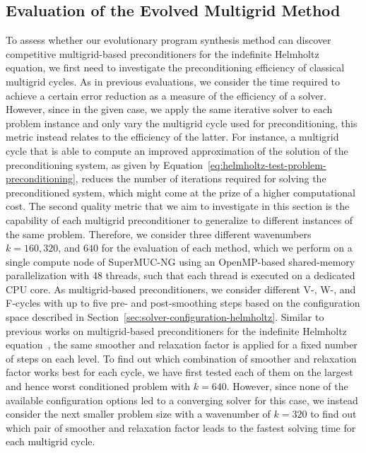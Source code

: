\subsection{Evaluation of the Evolved Multigrid Method}
To assess whether our evolutionary program synthesis method can discover competitive multigrid-based preconditioners for the indefinite Helmholtz equation, we first need to investigate the preconditioning efficiency of classical multigrid cycles.
As in previous evaluations, we consider the time required to achieve a certain error reduction as a measure of the efficiency of a solver.
However, since in the given case, we apply the same iterative solver to each problem instance and only vary the multigrid cycle used for preconditioning, this metric instead relates to the efficiency of the latter.
For instance, a multigrid cycle that is able to compute an improved approximation of the solution of the preconditioning system, as given by Equation~\eqref{eq:helmholtz-test-problem-preconditioning}, reduces the number of iterations required for solving the preconditioned system, which might come at the prize of a higher computational cost.
The second quality metric that we aim to investigate in this section is the capability of each multigrid preconditioner to generalize to different instances of the same problem.
Therefore, we consider three different wavenumbers $k = 160, 320$, and $640$ for the evaluation of each method, which we perform on a single compute node of SuperMUC-NG using an OpenMP-based shared-memory parallelization  with 48 threads, such that each thread is executed on a dedicated CPU core.
As multigrid-based preconditioners, we consider different V-, W-, and F-cycles with up to five pre- and post-smoothing steps based on the configuration space described in Section~\ref{sec:solver-configuration-helmholtz}.
Similar to previous works on multigrid-based preconditioners for the indefinite Helmholtz equation~\cite{erlangga2006multigrid,erlangga2008advances,cocquet2017shift}, the same smoother and relaxation factor is applied for a fixed number of steps on each level.
To find out which combination of smoother and relaxation factor works best for each cycle, we have first tested each of them on the largest and hence worst conditioned problem with $k = 640$.
However, since none of the available configuration options led to a converging solver for this case, we instead consider the next smaller problem size with a wavenumber of $k = 320$ to find out which pair of smoother and relaxation factor leads to the fastest solving time for each multigrid cycle.
